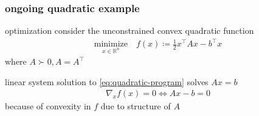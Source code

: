 \documentclass[10pt,dvipsnames*]{beamer}
\begin{document}
%
\begin{frame}
  \frametitle{ongoing quadratic example}
  \pause
  \begin{block}{optimization}
    consider the unconstrained convex quadratic function
    \begin{align}
      \label{eq:quadratic-program}
      \underset{x \in \mathbb{R}^n}{\text{minimize}} \quad f(x) \coloneqq \tfrac 12 x^{\top} A x - b^{\top} x
    \end{align}
    where $A \succ 0, A = A^{\top}$
  \end{block}
  \pause
  \begin{block}{linear system}
    solution to \cref{eq:quadratic-program} solves $Ax = b$
    \begin{align}
      \label{eq:linear-system}
      \nabla_x f(x) = 0 \iff Ax - b = 0
    \end{align}
    because of convexity in $f$ due to structure of $A$
  \end{block}
\end{frame}
%
\end{document}
